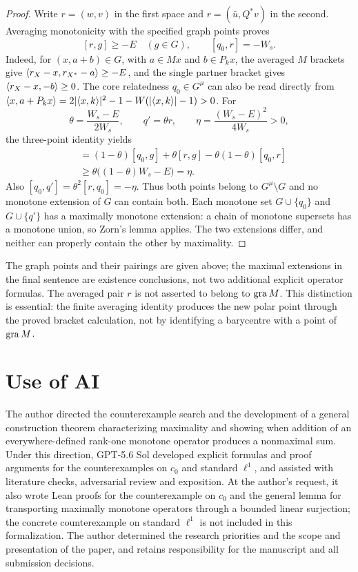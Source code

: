 \begin{proof}
Write $r=(w,v)$ in the first space and
$r=(\bar u,Q^*v)$ in the second. Averaging monotonicity with
the specified graph points proves
\[
[r,g]\ge-E\quad(g\in G),\qquad [q_0,r]=-W_s.
\]
Indeed, for $(x,a+b)\in G$, with $a\in Mx$ and $b\in P_kx$, the averaged $M$ brackets
give $\langle r_X-x,r_{X^*}-a\rangle\ge-E$, and the single
partner bracket gives $\langle r_X-x,-b\rangle\ge0$.
The core relatedness $q_0\in G^\mu$ can also be read directly
from $\langle x,a+P_kx\rangle=2|\langle x,k\rangle|^2-1-W(|\langle x,k\rangle|-1)>0$.
For
\[
\theta=\frac{W_s-E}{2W_s},\qquad q'=\theta r,
\qquad \eta=\frac{(W_s-E)^2}{4W_s}>0,
\]
the three-point identity yields
\begin{align*}
[q',g]
&=(1-\theta)[q_0,g]+\theta[r,g]
                 -\theta(1-\theta)[q_0,r]\\
&\ge\theta\bigl((1-\theta)W_s-E\bigr)=\eta.
\end{align*}
Also $[q_0,q']=\theta^2[r,q_0]=-\eta$.
Thus both points belong to $G^\mu\setminus G$ and no monotone
extension of $G$ can contain both. Each monotone set
$G\cup\{q_0\}$ and $G\cup\{q'\}$ has a maximally monotone
extension: a chain of monotone supersets has a monotone union,
so Zorn's lemma applies. The two extensions differ, and neither
can properly contain the other by maximality.
\end{proof}
The graph points and their pairings are given above; the maximal
extensions in the final sentence are existence conclusions, not
two additional explicit operator formulas. The averaged pair $r$
is not asserted to belong to $\operatorname{gra} M$. This distinction is essential:
the finite averaging identity produces the new polar point through
the proved bracket calculation, not by identifying a barycentre
with a point of $\operatorname{gra} M$.




\section*{Use of AI}
The author directed the counterexample search and the development of a
general construction theorem characterizing maximality and showing when
addition of an everywhere-defined rank-one monotone operator produces a
nonmaximal sum. Under this direction, GPT-5.6 Sol developed explicit
formulas and proof arguments for the counterexamples on $c_0$ and standard
$\ell^1$, and assisted with literature checks, adversarial review and
exposition. At the author's request, it also wrote Lean proofs for the
counterexample on $c_0$ and the general lemma for transporting maximally
monotone operators through a bounded linear surjection; the concrete
counterexample on standard $\ell^1$ is not included in this formalization.
The author determined the research priorities and the scope and
presentation of the paper, and retains responsibility for the manuscript
and all submission decisions.

\begingroup
\raggedright


\endgroup


